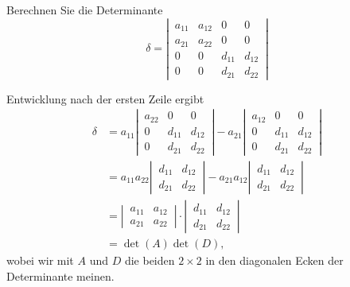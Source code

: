 Berechnen Sie die Determinante
\[
\delta=\left|\,
\begin{matrix}
a_{11}&a_{12}&0     &0     \\
a_{21}&a_{22}&0     &0     \\
0     &0     &d_{11}&d_{12}\\
0     &0     &d_{21}&d_{22}
\end{matrix}
\,\right|
\]

\begin{loesung}
Entwicklung nach der ersten Zeile ergibt
\begin{align*}
\delta
&=
a_{11}\left|\,
\begin{matrix}
a_{22}&0     &0     \\
0     &d_{11}&d_{12}\\
0     &d_{21}&d_{22}
\end{matrix}
\,\right|
-
a_{21}
\left|\,
\begin{matrix}
a_{12}&0     &0     \\
0     &d_{11}&d_{12}\\
0     &d_{21}&d_{22}
\end{matrix}
\,\right|
\\
&=
a_{11}a_{22}\left|\,
\begin{matrix}
d_{11}&d_{12}\\
d_{21}&d_{22}
\end{matrix}
\,\right|
-
a_{21}a_{12}
\left|\,
\begin{matrix}
d_{11}&d_{12}\\
d_{21}&d_{22}
\end{matrix}
\,\right|
\\
&=
\left|\,
\begin{matrix}
a_{11}&a_{12}\\
a_{21}&a_{22}
\end{matrix}
\,\right|
\cdot
\left|\,
\begin{matrix}
d_{11}&d_{12}\\
d_{21}&d_{22}
\end{matrix}
\,\right|
\\
&=\det(A)\det(D),
\end{align*}
wobei wir mit $A$ und $D$ die beiden $2\times 2$ in den diagonalen Ecken
der Determinante meinen.
\end{loesung}

